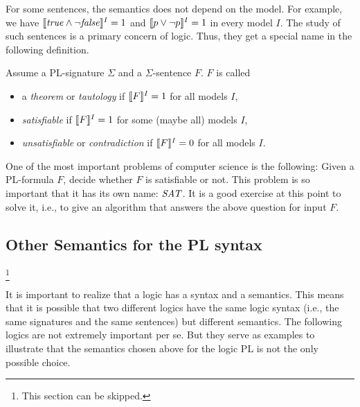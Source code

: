 For some sentences, the semantics does not depend on the model. For example, we have $\llbracket \mathit{true}\wedge\neg \mathit{false}\rrbracket^{I}=1$ and $\llbracket p\vee\neg p\rrbracket^{I}=1$ in every model $I$. The study of such sentences is a primary concern of logic. Thus, they get a special name in the following definition.

\begin{definition}\label{def:theorem}
Assume a PL-signature $\Sigma$ and a $\Sigma$-sentence $F$. $F$ is called
\begin{itemize}
\item a \emph{theorem} or \emph{tautology} if $\llbracket F\rrbracket^{I} = 1$ for all models $I$,
\item \emph{satisfiable} if $\llbracket F\rrbracket^{I} = 1$ for some (maybe all) models $I$,
\item \emph{unsatisfiable} or \emph{contradiction} if $\llbracket F\rrbracket^{I} = 0$ for all models $I$.
\end{itemize}
\end{definition}

\begin{remark}
One of the most important problems of computer science is the following: Given a PL-formula $F$, decide whether $F$ is satisfiable or not. This problem is so important that it has its own name: $\mathit{SAT}$. It is a good exercise at this point to solve it, i.e., to give an algorithm that answers the above question for input $F$.
\end{remark}

\subsection{Other Semantics for the PL syntax}

\footnote{This section can be skipped.}

It is important to realize that a logic has a syntax and a semantics. This means that it is possible that two different logics have the same logic syntax (i.e., the same signatures and the same sentences) but different semantics. The following logics are not extremely important per se. But they serve as examples to illustrate that the semantics chosen above for the logic PL is not the only possible choice.

